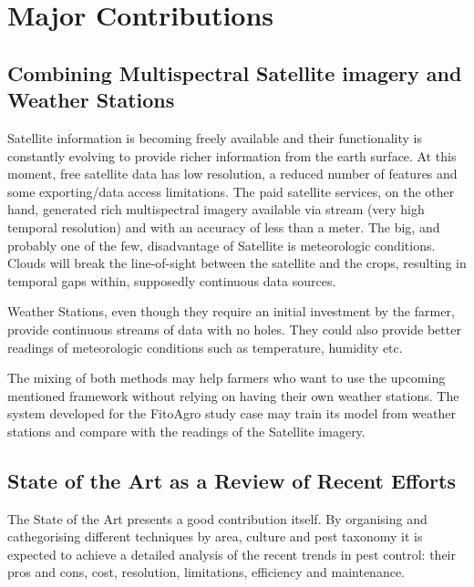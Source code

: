 
\section{Major Contributions} %
\label{sec:contributions}

\subsection{Combining Multispectral Satellite imagery and Weather Stations}
\label{sec:satellite_and_weather_stations}

Satellite information is becoming freely available and their functionality is constantly evolving to provide richer information from the earth surface. At this moment, free satellite data has low resolution, a reduced number of features and some exporting/data access limitations. The paid satellite services, on the other hand, generated rich multispectral imagery available via stream (very high temporal resolution) and with an accuracy of less than a meter. The big, and probably one of the few, disadvantage of Satellite is meteorologic conditions. Clouds will break the line-of-sight between the satellite and the crops, resulting in temporal gaps within, supposedly continuous data sources.

Weather Stations, even though they require an initial investment by the farmer, provide continuous streams of data with no holes. They could also provide better readings of meteorologic conditions such as temperature, humidity etc.

The mixing of both methods may help farmers who want to use the upcoming mentioned framework without relying on having their own weather stations. The system developed for the FitoAgro study case may train its model from weather stations and compare with the readings of the Satellite imagery.

\subsection{State of the Art as a Review of Recent Efforts}
\label{sec:review_recent_efforts}

The State of the Art presents a good contribution itself. By organising and cathegorising different techniques by area, culture and pest taxonomy it is expected to achieve a detailed analysis of the recent trends in pest control: their pros and cons, cost, resolution, limitations, efficiency and maintenance.

